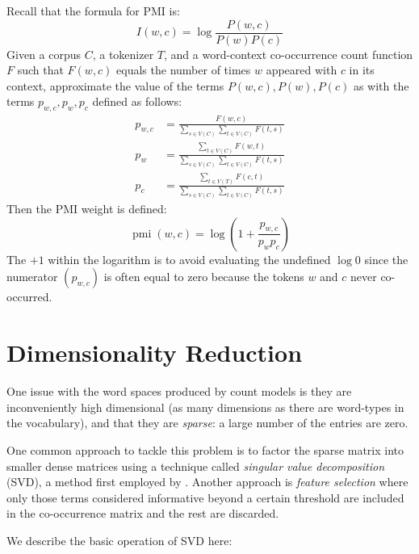 \begin{definition}
  Recall that the formula for PMI is:
  \begin{equation*}
    I(w,c)=\log\frac{P(w,c)}{P(w)P(c)}
  \end{equation*}
  Given a corpus $C$, a tokenizer $T$, and a word-context co-occurrence count function $F$ such that $F(w,c)$ equals the number of times $w$ appeared with $c$ in its context, approximate the value of the terms $P(w,c), P(w), P(c)$ as with the terms $p_{w,c}, p_w, p_c$ defined as follows:
  \begin{align}
    p_{w,c}&=\frac{F(w,c)}{\sum_{s\in V(C)}\sum_{t\in V(C)}F(t,s)}\\[0.5em]
    p_{w}&=\frac{\sum_{t\in V(C)}F(w,t)}{\sum_{s\in V(C)}\sum_{t\in V(C)}F(t,s)}\\[0.5em]
    p_{c}&=\frac{\sum_{t\in V(T)}F(c,t)}{\sum_{s\in V(C)}\sum_{t\in V(C)}F(t,s)}
  \end{align}
  Then the PMI weight is defined:
  \begin{equation}
    \operatorname{pmi} (w, c)=\log\left(1+\frac{p_{w,c}}{p_w p_c}\right)
  \end{equation}
  The $+1$ within the logarithm is to avoid evaluating the undefined $\log 0$ since the numerator $(p_{w,c})$ is often equal to zero because the tokens $w$ and $c$ never co-occurred.
\end{definition}

\section{Dimensionality Reduction}
One issue with the word spaces produced by count models is they are inconveniently high dimensional (as many dimensions as there are word-types in the vocabulary), and that they are \emph{sparse}: a large number of the entries are zero.

One common approach to tackle this problem is to factor the sparse matrix into smaller dense matrices using a technique called \emph{singular value decomposition} (SVD), a method first employed by \textcite{dumais-1988-using-lsa-to-improve}. Another approach is \emph{feature selection} where only those terms considered informative beyond a certain threshold are included in the co-occurrence matrix and the rest are discarded.

We describe the basic operation of SVD here:

